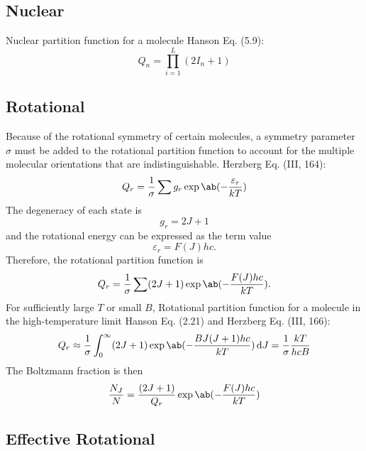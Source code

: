 \documentclass[11pt, twoside, fleqn]{report}
\begin{document}
    \subsection{Nuclear}

    Nuclear partition function for a molecule Hanson Eq. (5.9):
    \begin{equation*}
        Q_n = \prod_{i = 1}^L (2I_n + 1)
    \end{equation*}

    \subsection{Rotational}
    Because of the rotational symmetry of certain molecules, a symmetry parameter $\sigma$ must be added to the rotational partition function to account for the multiple molecular orientations that are indistinguishable.
    Herzberg Eq. (III, 164):
    \begin{equation*}
        Q_r = \frac{1}{\sigma} \sum g_r\exp\ab(-\frac{\varepsilon_r}{kT})
    \end{equation*}
    The degeneracy of each state is
    \begin{equation*}
        g_r = 2J + 1
    \end{equation*}
    and the rotational energy can be expressed as the term value
    \begin{equation*}
        \varepsilon_r = F(J)hc.
    \end{equation*}
    Therefore, the rotational partition function is
    \begin{equation*}
        Q_r = \frac{1}{\sigma} \sum (2J + 1)\exp\ab(-\frac{F(J)hc}{kT}).
    \end{equation*}
    For sufficiently large $T$ or small $B$,
    Rotational partition function for a molecule in the high-temperature limit Hanson Eq. (2.21) and Herzberg Eq. (III, 166):
    \begin{equation*}
        Q_r \approx \frac{1}{\sigma} \int_0^{\infty} (2J + 1)\exp\ab(-\frac{BJ(J + 1)hc}{kT}) \odif{J} = \frac{1}{\sigma}\frac{kT}{hcB}
    \end{equation*}
    The Boltzmann fraction is then
    \begin{equation*}
        \frac{N_J}{N} = \frac{(2J + 1)}{Q_r}\exp\ab(-\frac{F(J)hc}{kT})
    \end{equation*}

    \subsection{Effective Rotational}
\end{document}
